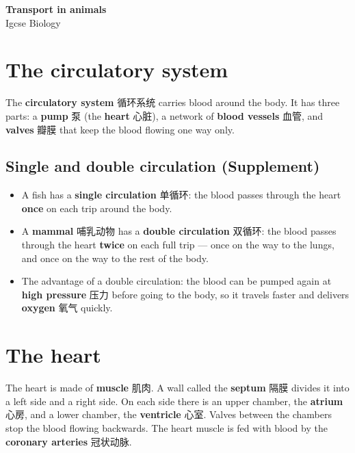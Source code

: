 \documentclass[11pt]{article}
\begin{document}
\begin{center}
  {\LARGE\bfseries Transport in animals}\\[0.35em]
  {\large Igcse Biology}
\end{center}
\vspace{0.6em}

\section*{The circulatory system}

The \textbf{circulatory system} 循环系统 carries blood around the body. It has three parts: a \textbf{pump} 泵 (the \textbf{heart} 心脏), a network of \textbf{blood vessels} 血管, and \textbf{valves} 瓣膜 that keep the blood flowing one way only.

\subsection*{Single and double circulation (Supplement)}

\begin{itemize}
\item A fish has a \textbf{single circulation} 单循环: the blood passes through the heart \textbf{once} on each trip around the body.

\item A \textbf{mammal} 哺乳动物 has a \textbf{double circulation} 双循环: the blood passes through the heart \textbf{twice} on each full trip — once on the way to the lungs, and once on the way to the rest of the body.

\item The advantage of a double circulation: the blood can be pumped again at \textbf{high pressure} 压力 before going to the body, so it travels faster and delivers \textbf{oxygen} 氧气 quickly.

\end{itemize}

\section*{The heart}

The heart is made of \textbf{muscle} 肌肉. A wall called the \textbf{septum} 隔膜 divides it into a left side and a right side. On each side there is an upper chamber, the \textbf{atrium} 心房, and a lower chamber, the \textbf{ventricle} 心室. Valves between the chambers stop the blood flowing backwards. The heart muscle is fed with blood by the \textbf{coronary arteries} 冠状动脉.
\end{document}
